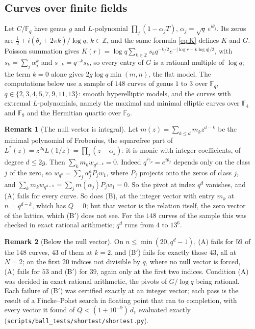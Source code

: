 \documentclass[11pt]{article}
\theoremstyle{definition}
\newtheorem*{remark}{Remark}
\newcommand{\KH}{K}
\begin{document}
\subsection{Curves over finite fields}

Let $C/\mathbb F_q$ have genus $g$ and $L$-polynomial $\prod_j
(1 - \alpha_j T)$, $\alpha_j = \sqrt q\,e^{i\theta_j}$. Its
zeros are $\frac12 + i(\theta_j + 2\pi k)/\log q$, $k \in \mathbb Z$, and the same formula \eqref{eq:K} defines $\KH$
and $G$. Poisson summation gives $\KH(r) = \log q \sum_{k \in \mathbb Z} s_k q^{-k/2} e^{-|\log r - k \log q|/2}$, with
$s_k = \sum_j \alpha_j^k$ and $s_{-k} = q^{-k} s_k$, so every entry of $G$ is a rational multiple of $\log q$; the term
$k = 0$ alone gives $2g \log q \min(m, n)$, the flat model. The
computations below use a sample of $148$ curves of genus $1$
to $3$ over $\mathbb F_q$, $q \in \{2, 3, 4, 5, 7, 9, 11, 13\}$: smooth hyperelliptic models, and the curves with
extremal $L$-polynomials, namely the maximal and minimal elliptic curves over $\mathbb F_4$ and $\mathbb F_9$ and the
Hermitian quartic over $\mathbb F_9$.

\begin{remark}[The null vector is integral]
Let $m(z) = \sum_{k \le d} m_k z^{d - k}$ be the minimal polynomial of Frobenius, the squarefree part of $L^*(z) =
z^{2g} L(1/z) = \prod_j (z - \alpha_j)$: it is monic with integer coefficients, of degree $d \le 2g$. Then $\sum_k m_k
w_{q^{d - k}} = 0$. Indeed $q^{i\gamma_\rho} = e^{i\theta_j}$ depends only on the class $j$ of the zero, so $w_{q^a} =
\sum_j \alpha_j^a P_j w_1$, where $P_j$ projects onto the zeros of class $j$, and $\sum_k m_k w_{q^{d - k}} = \sum_j
m(\alpha_j) P_j w_1 = 0$. So the pivot at index $q^d$ vanishes, and (A) fails for every curve. So does (B), at the
integer vector with entry $m_k$
at $n = q^{d - k}$, which has $Q = 0$; but that vector is the relation itself, the zero vector of the lattice, which
(B$'$) does not see. For the
$148$ curves of the sample this was checked in exact
rational arithmetic; $q^d$ runs from $4$ to $13^6$.
\end{remark}

\begin{remark}[Below the null vector]
On $n \le \min(20, q^d - 1)$, (A) fails for $59$ of the $148$
curves, $43$ of them at $k = 2$, and (B$'$) fails for exactly
those $43$, all at $N = 2$; on the first $20$ indices not divisible by $q$, where no null vector is forced, (A) fails
for $53$
and (B$'$) for $39$, again only at the first two indices. Condition (A) was decided in exact rational arithmetic,
the pivots of $G/\log q$ being rational. Each failure of (B$'$) was certified exactly at an integer vector; each pass
is the result of a Fincke--Pohst search in floating point that ran to completion, with every vector it found of
$Q < (1 + 10^{-9})\,d_1$ evaluated exactly (\texttt{scripts/ball\_tests/shortest/shortest.py}).
\end{remark}
\end{document}
